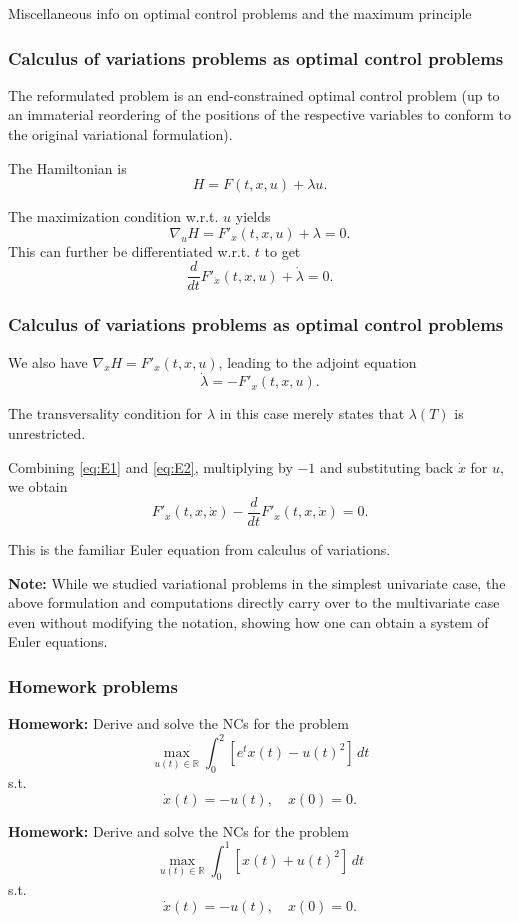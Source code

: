 \documentclass[10pt]{beamer}
\theoremstyle{definition}
\begin{document}
\begin{section}{Miscellaneous info on optimal control problems and the maximum principle}
\begin{frame}[fragile]
\frametitle{Calculus of variations problems as optimal control problems}
The reformulated problem is an end-constrained optimal control problem (up to an immaterial reordering of the positions of the respective variables to conform to the original variational formulation).

The Hamiltonian is \[ H=F(t,x,u)+\lambda u. \]

The maximization condition w.r.t. $ u $ yields \[ \nabla_u H = F'_{\dot{x}}(t,x,u)+\lambda = 0. \]
This can further be differentiated w.r.t. $ t $ to get \begin{equation}\label{eq:E1}
\frac{d}{dt}F'_{\dot{x}}(t,x,u)+\dot{\lambda} = 0.\tag{$ \star $}
\end{equation} 
\end{frame}

\begin{frame}[fragile]
\frametitle{Calculus of variations problems as optimal control problems}
We also have $ \nabla_x H = F'_x(t,x,u) $, leading to the adjoint equation \begin{equation}\label{eq:E2}
\dot{\lambda} = -F'_x(t,x,u).\tag{$ \star \star$}
\end{equation}  

The transversality condition for $ \lambda $ in this case merely states that $ \lambda(T) $ is unrestricted.

Combining \eqref{eq:E1} and \eqref{eq:E2}, multiplying by $ -1 $ and substituting back $ \dot{x} $ for $ u $, we obtain \[ F'_x(t,x,\dot{x})-\frac{d}{dt}F'_{\dot{x}}(t,x,\dot{x}) = 0. \]

This is the familiar Euler equation from calculus of variations.\bigskip

\textbf{Note:} While we studied variational problems in the simplest univariate case, the above formulation and computations directly carry over to the multivariate case even without modifying the notation, showing how one can obtain a system of Euler equations.
\end{frame}

\end{section}


\begin{frame}[fragile]
\frametitle{Homework problems}
\textbf{Homework:} Derive and solve the NCs for the problem \[ \max_{u(t)\in \mathbb{R}}\int_{0}^{2}[e^t x(t)-u(t)^2]\,dt \] s.t. \[ \dot{x}(t)=-u(t),\quad x(0) = 0. \] \bigskip

\textbf{Homework:} Derive and solve the NCs for the problem \[ \max_{u(t)\in \mathbb{R}}\int_{0}^{1}[x(t)+u(t)^2]\,dt \] s.t. \[ \dot{x}(t)=-u(t),\quad x(0) = 0. \]
\end{frame}
\end{document}
